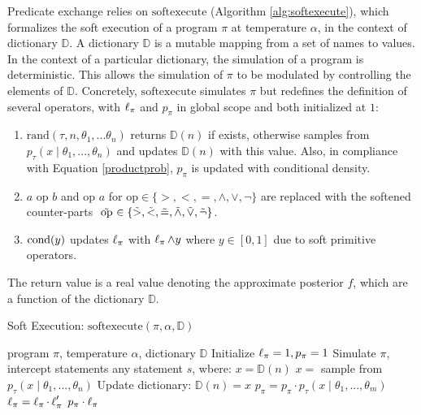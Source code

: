 Predicate exchange relies on $\textrm{softexecute}$
(Algorithm \ref{alg:softexecute}), which formalizes the soft execution of a program $\pi$ at temperature $\alpha$, in the context of dictionary $\mathbb{D}$.
A dictionary $\mathbb{D}$ is a mutable mapping from a set of names to values.
In the context of a particular dictionary, the simulation of a program is deterministic.
This allows the simulation of $\pi$ to be modulated by controlling the elements of $\mathbb{D}$.
Concretely, $\textrm{softexecute}$ simulates $\pi$ but redefines the definition of several operators, with $\operatorname{\ell}_\pi$ and $p_\pi$ in global scope and both initialized at $1$:

\begin{enumerate}
  \item $\textrm{rand}(\tau, n, \theta_1, ...\theta_n)$ returns $\mathbb{D}(n)$ if exists, otherwise samples from $p_\tau(x \mid \theta_1, ..., \theta_n)$ and updates $\mathbb{D}(n)$ with this value.  Also, in compliance with Equation \ref{productprob}, $p_\pi$ is updated with conditional density. 
  \item $a \text{ op } b$ and $\textrm{op } a$ for $\textrm{op} \in \{>, <, =, \land, \lor, \neg\}$ are replaced with the softened counter-parts $\mathrel{\tilde{\textrm{ op }}} \in \{\mathrel{\tilde{>}}, \mathrel{\tilde{<}}, \mathrel{\tilde{=}}, \mathrel{\tilde{\land}}, \mathrel{\tilde{\lor}}, \mathrel{\tilde{\neg}}\}$.
  \item $\operatorname{cond}(y)$ updates $\operatorname{\ell}_\pi$ with $\operatorname{\ell}_\pi \land y$ where $y \in [0,1]$ due to soft primitive operators.  
\end{enumerate}

The return value is a real value denoting the approximate posterior $f$, which are a function of the dictionary $\mathbb{D}$.

\begin{algorithm}[tb]
  \caption{Soft Execution: $\textrm{softexecute}(\pi, \alpha, \mathbb{D})$}
  \label{alg:softexecute}
\begin{algorithmic}
 program $\pi$, temperature $\alpha$, dictionary $\mathbb{D}$
\STATE Initialize $\operatorname{\ell}_\pi = 1, p_\pi = 1$
\STATE Simulate $\pi$, intercept statements any statement $s$, wbere:   
   \STATE $x = \mathbb{D}(n)$
 \ELSE
   \STATE $x = $ sample from $p_\tau(x \mid \theta_1, ..., \theta_n)$
   \STATE Update dictionary: $\mathbb{D}(n) = x$
 \ENDIF
 \STATE $p_\pi = p_\pi \cdot p_\tau(x \mid \theta_1, ..., \theta_m)$
   \STATE $\operatorname{\ell}_\pi = \operatorname{\ell}_\pi \cdot \operatorname{\ell}_\pi'$
 \ENDIF
{} $p_\pi \cdot \operatorname{\ell}_\pi$
\end{algorithmic}
\end{algorithm}

